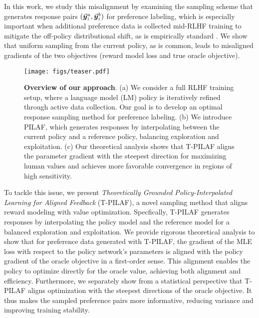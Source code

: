 In this work, we study this misalignment by examining the sampling scheme that generates
response pairs $(\vec{\boldsymbol{y}}\!\,^a_{i}, \vec{\boldsymbol{y}}\!\,^b_{i})$ for preference labeling, which is especially important when additional preference data is collected mid-RLHF training to mitigate the off-policy distributional shift, as is empirically standard
\citep{touvron2023llama,bai2022training}. We show that
uniform sampling from the current policy, as is common, leads to misaligned gradients of the two
objectives (reward model loss and true oracle objective).



\begin{figure*}[t]
    \centering
    \vspace{-13pt}\texttt{[image: figs/teaser.pdf]}
    \vspace{2mm}
    \caption{\textbf{Overview of our approach}. (a) We consider a full RLHF training setup, where a language model (LM) policy is iteratively refined through active data collection. Our goal is to develop an optimal response sampling method for preference labeling. (b) We introduce PILAF, which generates responses by interpolating between the current policy and a reference policy, balancing exploration and exploitation. (c) Our theoretical analysis shows that T-PILAF aligns the parameter gradient with the steepest direction for maximizing human values and achieves more favorable convergence in regions of high sensitivity.}
    \label{fig:teaser}
\end{figure*}



To tackle this issue, we present {\em Theoretically Grounded Policy-Interpolated Learning for Aligned Feedback} (T-PILAF), a novel sampling method that aligns reward modeling with value optimization. Specfically, T-PILAF generates responses by interpolating the policy model and the reference model for a balanced exploration and exploitation. 
We provide rigorous theoretical analysis to show that for preference data generated with T-PILAF, the gradient of the MLE loss with respect to the policy network's parameters is aligned with the policy gradient of the oracle objective in a first-order sense. This alignment enables the policy to optimize directly for the oracle value, achieving both alignment and efficiency. Furthermore, we separately show from a statistical perspective that T-PILAF aligns optimization with the steepest directions of the oracle objective. It thus makes the sampled preference pairs more informative, reducing variance and improving training stability.

